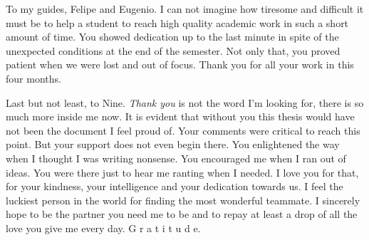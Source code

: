 \documentclass[english, a4paper, 12pt]{article}
\begin{document}
To my guides, Felipe and Eugenio. I can not imagine how tiresome and difficult it must be to help a student to reach high quality academic work in such a short amount of time. You showed dedication up to the last minute in spite of the unexpected conditions at the end of the semester. Not only that, you proved patient when we were lost and out of focus. Thank you for all your work in this four months.

Last but not least, to Nine. \textit{Thank you} is not the word I'm looking for, there is so much more inside me now. It is evident that without you this thesis would have not been the document I feel proud of. Your comments were critical to reach this point. But your support does not even begin there. You enlightened the way when I thought I was writing nonsense. You encouraged me when I ran out of ideas. You were there just to hear me ranting when I needed. I love you for that, for your kindness, your intelligence and your dedication towards us. I feel the luckiest person in the world for finding the most wonderful teammate. I sincerely hope to be the partner you need me to be and to repay at least a drop of all the love you give me every day. G r a t i t u d e.



\end{document}
